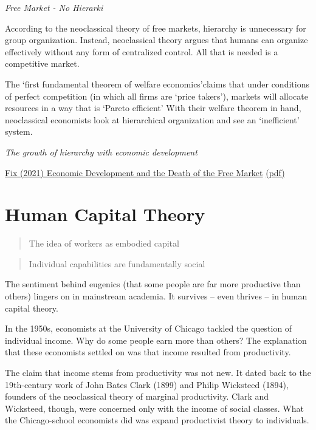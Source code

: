 \documentclass[
]{book}
\begin{document}
\emph{Free Market - No Hierarki}

According to the neoclassical theory of free markets,
hierarchy is unnecessary for group organization. Instead, neoclassical theory
argues that humans can organize effectively without any form of centralized
control. All that is needed is a competitive market.

The `first fundamental theorem of welfare economics'claims
that under conditions of perfect competition (in which all firms are `price takers'),
markets will allocate resources in a way that is `Pareto efficient'
With their welfare theorem in hand, neoclassical economists look at
hierarchical organization and see an `inefficient' system.

\emph{The growth of hierarchy with economic development}

\href{Fix_2021_Free_Market.pdf}{Fix (2021) Economic Development and the Death of the Free Market}
\href{pdf/Fix_2021_Free_Market.pdf}{(pdf)}

\hypertarget{human-capital-theory}{%
\section{Human Capital Theory}\label{human-capital-theory}}

\begin{quote}
The idea of workers as embodied capital
\end{quote}

\begin{quote}
Individual capabilities are fundamentally social
\end{quote}

The sentiment behind eugenics (that some people are far more productive than others)
lingers on in mainstream academia.
It survives -- even thrives -- in human capital theory.

In the 1950s, economists at the University of Chicago tackled the question of individual income.
Why do some people earn more than others?
The explanation that these economists settled on was that income resulted from productivity.

The claim that income stems from productivity was not new.
It dated back to the 19th-century work of John Bates Clark (1899) and Philip Wicksteed (1894),
founders of the neoclassical theory of marginal productivity.
Clark and Wicksteed, though, were concerned only with the income of social classes.
What the Chicago-school economists did was expand productivist theory to individuals.
\end{document}
